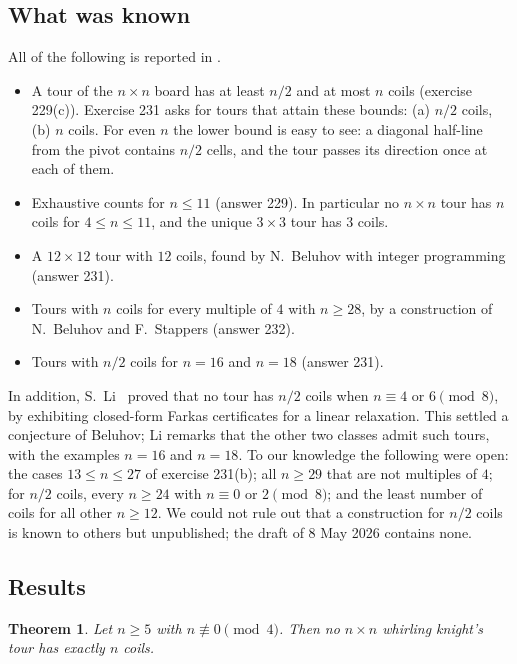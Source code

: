 \documentclass[11pt]{amsart}
\newtheorem{theorem}{Theorem}
\theoremstyle{remark}
\begin{document}
\subsection*{What was known}
All of the following is reported in \cite{knuth}.
\begin{itemize}
\item A tour of the $n\times n$ board has at least $n/2$ and at most $n$ coils (exercise 229(c)). Exercise 231
asks for tours that attain these bounds: (a) $n/2$ coils, (b) $n$ coils. For even $n$ the lower bound is easy to
see: a diagonal half-line from the pivot contains $n/2$ cells, and the tour passes its direction once at each of
them.
\item Exhaustive counts for $n\le 11$ (answer 229). In particular no $n\times n$ tour has $n$ coils for
$4\le n\le 11$, and the unique $3\times3$ tour has $3$ coils.
\item A $12\times12$ tour with $12$ coils, found by N.~Beluhov with integer programming (answer 231).
\item Tours with $n$ coils for every multiple of $4$ with $n\ge28$, by a construction of N.~Beluhov and F.~Stappers
(answer 232).
\item Tours with $n/2$ coils for $n=16$ and $n=18$ (answer 231).
\end{itemize}
In addition, S.~Li~\cite{li} proved that no tour has $n/2$ coils when $n\equiv4$ or $6\pmod 8$, by exhibiting
closed-form Farkas certificates for a linear relaxation. This settled a conjecture of Beluhov; Li remarks that the
other two classes admit such tours, with the examples $n=16$ and $n=18$. To our knowledge the following were open:
the cases $13\le n\le27$ of exercise 231(b); all $n\ge29$ that are not multiples of $4$; for $n/2$ coils, every
$n\ge24$ with $n\equiv0$ or $2\pmod 8$; and the least number of coils for all other $n\ge12$. We could not rule out
that a construction for $n/2$ coils is known to others but unpublished; the draft \cite{knuth} of 8 May 2026
contains none.

\subsection*{Results}
\begin{theorem}\label{thm:main}
Let $n\ge5$ with $n\not\equiv0\pmod4$. Then no $n\times n$ whirling knight's tour has exactly $n$ coils.
\end{theorem}
\end{document}
